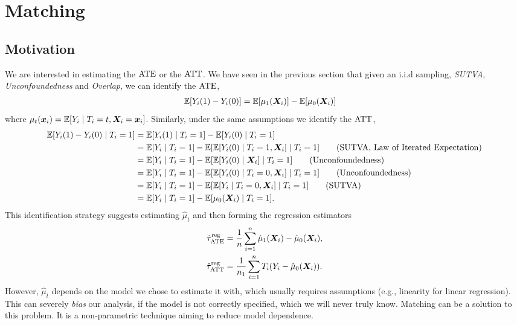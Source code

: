 \documentclass[11pt]{exam}
\begin{document}

\begingroup\small

\section{Matching}
\subsection{Motivation}
We are interested in estimating the $\mathrm{ATE}$ or the $\mathrm{ATT}$. We have seen in the previous section that given an i.i.d sampling, \emph{SUTVA}, \emph{Unconfoundedness} and \emph{Overlap}, we can identify the $\mathrm{ATE}$,
\begin{align*}
    \mathbb{E}[Y_i(1) - Y_i(0)] &= \mathbb{E}[\mu_1(\bm{X}_i)] - \mathbb{E}[\mu_0(\bm{X}_i)]
\end{align*}
where $\mu_t(\bm{x}_i) = \mathbb{E}[Y_i \mid T_i = t, \bm{X}_i = \bm{x}_i]$. Similarly, under the same assumptions we identify the $\mathrm{ATT}$,
\begin{align*}
    \mathbb{E}[Y_i(1) - Y_i(0) \mid T_i = 1] &= \mathbb{E}[Y_i(1)  \mid T_i = 1] - \mathbb{E}[Y_i(0) \mid T_i = 1]
    \\
    &= \mathbb{E}[Y_i  \mid T_i = 1] - \mathbb{E}[\mathbb{E}[Y_i(0) \mid T_i = 1, \bm{X}_i] \mid T_i = 1]  \qquad \text{(SUTVA, Law of Iterated Expectation)}
    \\
    &= \mathbb{E}[Y_i  \mid T_i = 1] - \mathbb{E}[\mathbb{E}[Y_i(0) \mid \bm{X}_i] \mid T_i = 1]  \qquad \text{(Unconfoundedness)}
    \\
    &= \mathbb{E}[Y_i  \mid T_i = 1] - \mathbb{E}[\mathbb{E}[Y_i(0) \mid T_i = 0, \bm{X}_i] \mid T_i = 1]  \qquad \text{(Unconfoundedness)}
    \\
    &= \mathbb{E}[Y_i  \mid T_i = 1] - \mathbb{E}[\mathbb{E}[Y_i \mid T_i = 0, \bm{X}_i] \mid T_i = 1]  \qquad \text{(SUTVA)}
    \\
    &= \mathbb{E}[Y_i  \mid T_i = 1] - \mathbb{E}[\mu_0(\bm{X}_i) \mid T_i = 1].
\end{align*}
This identification strategy suggests estimating $\hat \mu_t$ and then forming the regression estimators
\begin{align*}
    \hat \tau^{\mathrm{reg}}_{\mathrm{ATE}} &= \frac{1}{n} \sum_{i=1}^n \hat \mu_1(\bm{X}_i) - \hat \mu_0(\bm{X}_i),
    \\
    \hat \tau^\mathrm{reg}_{\mathrm{ATT}} &= \frac{1}{n_1} \sum_{i=1}^n  T_i (Y_i - \hat \mu_0(\bm{X}_i)).
\end{align*}
However, $\hat \mu_t$ depends on the model we chose to estimate it with, which usually requires assumptions (e.g., linearity for linear regression). This can severely \emph{bias} our analysis, if the model is not correctly specified, which we will never truly know. Matching can be a solution to this problem. It is a non-parametric technique aiming to reduce model dependence.
\end{document}
